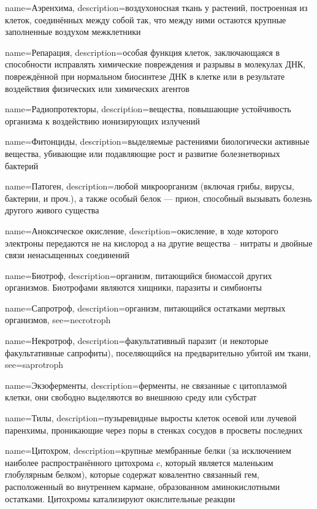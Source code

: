 {
name={Аэренхима},
description={воздухоносная ткань у растений, построенная из клеток, соединённых между собой так, что между ними остаются крупные заполненные воздухом межклетники}
}

{
name={Репарация},
description={особая функция клеток, заключающаяся в способности исправлять химические повреждения и разрывы в молекулах ДНК, повреждённой при нормальном биосинтезе ДНК в клетке или в результате воздействия физических или химических агентов}
}

{
name={Радиопротекторы},
description={вещества, повышающие устойчивость организма к воздействию ионизирующих излучений}
}

{
name={Фитонциды},
description={выделяемые растениями биологически активные вещества, убивающие или подавляющие рост и развитие болезнетворных бактерий}
}

{
name={Патоген},
description={любой микроорганизм (включая грибы, вирусы, бактерии, и проч.), а также особый белок — прион, способный вызывать болезнь другого живого существа}
}

{
name={Аноксическое окисление},
description={окисление, в ходе которого электроны передаются не на кислород а на другие вещества -- нитраты и двойные связи ненасыщенных соединений}
}

{
name={Биотроф},
description={организм, питающийся биомассой других организмов. Биотрофами являются хищники, паразиты и симбионты}
}

{
name={Сапротроф},
description={организм, питающийся остатками мертвых организмов},
see={necrotroph}
}

{
name={Некротроф},
description={факультативный паразит (и некоторые факультативные сапрофиты), поселяющийся на предварительно убитой им ткани},
see={saprotroph}
}

{
name={Экзоферменты},
description={ферменты, не связанные с цитоплазмой клетки, они свободно выделяются во внешнюю среду или субстрат}
}

{
name={Тилы},
description={пузыревидные выросты клеток осевой или лучевой паренхимы, проникающие через поры в стенках сосудов в просветы последних}
}

{
name={Цитохром},
description={крупные мембранные белки (за исключением наиболее распространённого цитохрома c, который является маленьким глобулярным белком), которые содержат ковалентно связанный гем, расположенный во внутреннем кармане, образованном аминокислотными остатками. Цитохромы катализируют окислительные реакции}
}

 
